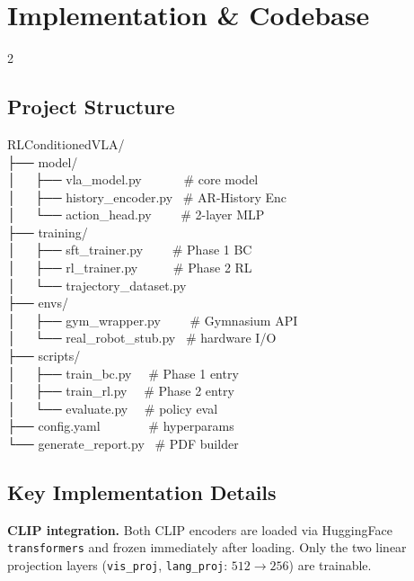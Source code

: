 \documentclass[11pt, a4paper]{article}
\begin{document}
\newpage
\section{Implementation \& Codebase}

\begin{multicols}{2}

\subsection*{Project Structure}

\begin{codebox}
RLConditionedVLA/\\
├── model/\\
│\ \ \ ├── vla\_model.py \ \ \ \ \ \ \# core model\\
│\ \ \ ├── history\_encoder.py \ \# AR-History Enc\\
│\ \ \ └── action\_head.py \ \ \ \ \# 2-layer MLP\\
├── training/\\
│\ \ \ ├── sft\_trainer.py \ \ \ \ \# Phase 1 BC\\
│\ \ \ ├── rl\_trainer.py \ \ \ \ \ \# Phase 2 RL\\
│\ \ \ └── trajectory\_dataset.py\\
├── envs/\\
│\ \ \ ├── gym\_wrapper.py \ \ \ \ \# Gymnasium API\\
│\ \ \ └── real\_robot\_stub.py \ \# hardware I/O\\
├── scripts/\\
│\ \ \ ├── train\_bc.py \ \ \# Phase 1 entry\\
│\ \ \ ├── train\_rl.py \ \ \# Phase 2 entry\\
│\ \ \ └── evaluate.py \ \ \# policy eval\\
├── config.yaml \ \ \ \ \ \ \ \# hyperparams\\
└── generate\_report.py \ \# PDF builder
\end{codebox}

\columnbreak

\subsection*{Key Implementation Details}

\textbf{CLIP integration.}\enspace
Both CLIP encoders are loaded via HuggingFace \texttt{transformers} and
frozen immediately after loading.  Only the two linear projection layers
(\texttt{vis\_proj}, \texttt{lang\_proj}: $512 \to 256$) are trainable.


\end{multicols}
\end{document}
